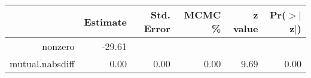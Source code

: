 \begin{table}[ht]
\centering
\begin{tabular}{rrrrrr}
  \hline
 & Estimate & Std. Error & MCMC \% & z value & Pr($>$$|$z$|$) \\ 
  \hline
nonzero & -29.61 &  &  &  &  \\ 
  mutual.nabsdiff & 0.00 & 0.00 & 0.00 & 9.69 & 0.00 \\ 
   \hline
\end{tabular}
\end{table}
